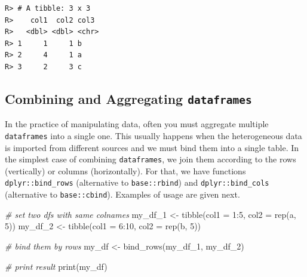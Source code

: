 \documentclass[
  12pt,
]{book}
\newenvironment{Shaded}{\begin{snugshade}}{\end{snugshade}}
\newcommand{\AttributeTok}[1]{\textcolor[rgb]{0.61,0.61,0.61}{#1}}
\newcommand{\CommentTok}[1]{\textcolor[rgb]{0.37,0.37,0.37}{\textit{#1}}}
\newcommand{\DecValTok}[1]{\textcolor[rgb]{0.06,0.06,0.06}{#1}}
\newcommand{\FloatTok}[1]{\textcolor[rgb]{0.06,0.06,0.06}{#1}}
\newcommand{\FunctionTok}[1]{\textcolor[rgb]{0,0,0}{#1}}
\newcommand{\NormalTok}[1]{#1}
\newcommand{\OtherTok}[1]{\textcolor[rgb]{0.37,0.37,0.37}{#1}}
\newcommand{\SpecialCharTok}[1]{\textcolor[rgb]{0,0,0}{#1}}
\newcommand{\StringTok}[1]{\textcolor[rgb]{0.5,0.5,0.5}{#1}}
\begin{document}
\begin{Shaded}
\end{Shaded}

\begin{verbatim}
R> # A tibble: 3 x 3
R>    col1  col2 col3 
R>   <dbl> <dbl> <chr>
R> 1     1     1 b    
R> 2     4     1 a    
R> 3     2     3 c
\end{verbatim}

\hypertarget{combining-and-aggregating-dataframes}{%
\subsection{\texorpdfstring{Combining and Aggregating \texttt{dataframes}}{Combining and Aggregating dataframes}}\label{combining-and-aggregating-dataframes}}

In the practice of manipulating data, often you must aggregate multiple \texttt{dataframes} into a single one. This usually happens when the heterogeneous data is imported from different sources and we must bind them into a single table. In the simplest case of combining \texttt{dataframes}, we join them according to the rows (vertically) or columns (horizontally). For that, we have functions \texttt{dplyr::bind\_rows} (alternative to \texttt{base::rbind}) and \texttt{dplyr::bind\_cols} (alternative to \texttt{base::cbind}). Examples of usage are given next.  

\begin{Shaded}
\begin{Highlighting}[]
\CommentTok{\# set two dfs with same colnames}
\NormalTok{my\_df\_1 }\OtherTok{\textless{}{-}} \FunctionTok{tibble}\NormalTok{(}\AttributeTok{col1 =} \DecValTok{1}\SpecialCharTok{:}\DecValTok{5}\NormalTok{, }
                  \AttributeTok{col2 =} \FunctionTok{rep}\NormalTok{(}\StringTok{\textquotesingle{}a\textquotesingle{}}\NormalTok{, }\DecValTok{5}\NormalTok{))}
\NormalTok{my\_df\_2 }\OtherTok{\textless{}{-}} \FunctionTok{tibble}\NormalTok{(}\AttributeTok{col1 =} \DecValTok{6}\SpecialCharTok{:}\DecValTok{10}\NormalTok{, }
                  \AttributeTok{col2 =} \FunctionTok{rep}\NormalTok{(}\StringTok{\textquotesingle{}b\textquotesingle{}}\NormalTok{, }\DecValTok{5}\NormalTok{))}

\CommentTok{\# bind them by rows}
\NormalTok{my\_df }\OtherTok{\textless{}{-}} \FunctionTok{bind\_rows}\NormalTok{(my\_df\_1, my\_df\_2)}

\CommentTok{\# print result}
\FunctionTok{print}\NormalTok{(my\_df)}
\end{Highlighting}
\end{Shaded}
\end{document}
